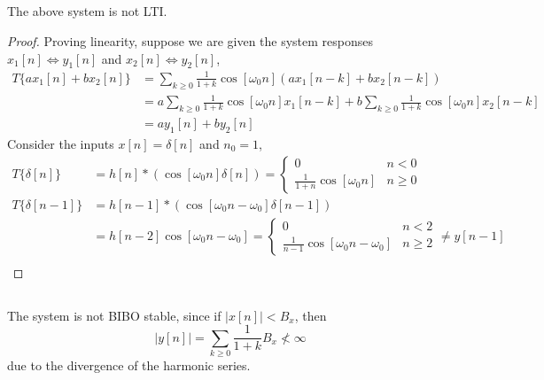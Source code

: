 \documentclass{article}
\begin{document}
\subsection{}

\begin{theorem}
    The above system is not LTI.
\end{theorem}
\begin{proof}
    Proving linearity, suppose we are given the system responses \(x_1[n] \iff y_1[n]\) and \(x_2[n] \iff y_2[n]\),
    \begin{align}
        T\{a x_1[n] + b x_2[n]\} &= \sum_{k \geqslant 0} \frac{1}{1 + k} \cos[\omega_0 n] (a x_1[n - k] + b x_2[n - k]) \\
        &= a \sum_{k \geqslant 0} \frac{1}{1 + k} \cos[\omega_0 n] x_1[n - k] + b \sum_{k \geqslant 0} \frac{1}{1 + k} \cos[\omega_0 n] x_2[n - k] \\
        &= a y_1[n] + b y_2[n]
    \end{align}
    Consider the inputs \(x[n] = \delta[n]\) and \(n_0 = 1\),
    \begin{align}
        T\{\delta[n]\} &= h[n] \ast (\cos[\omega_0 n] \delta[n]) =
        \begin{cases}
            0 & n < 0 \\
            \frac{1}{1 + n} \cos[\omega_0 n] & n \geqslant 0
        \end{cases} \\
        T\{\delta[n - 1]\} &= h[n - 1] \ast (\cos[\omega_0 n - \omega_0] \delta[n - 1]) \\
        &= h[n - 2] \cos[\omega_0 n - \omega_0] =
        \begin{cases}
            0 & n < 2 \\
            \frac{1}{n - 1} \cos[\omega_0 n - \omega_0] & n \geqslant 2
        \end{cases} \neq y[n - 1] \\
    \end{align}
\end{proof}

\subsection{}

The system is not BIBO stable, since if \(|x[n]| < B_x\), then
\begin{equation}
    |y[n]| = \sum_{k \geqslant 0} \frac{1}{1 + k} B_x \not< \infty
\end{equation}
due to the divergence of the harmonic series.
\end{document}
